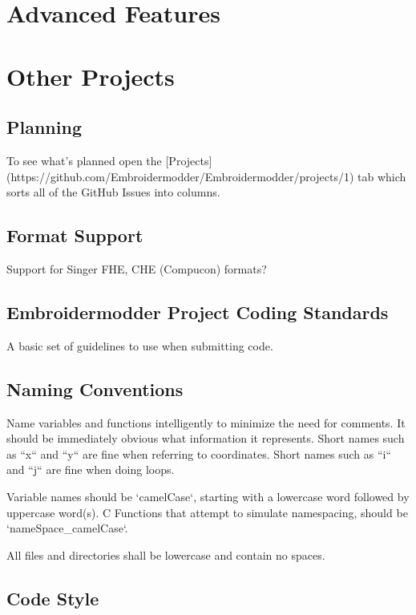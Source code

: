\documentclass[10pt]{report}
\begin{document}
\section{Advanced Features}

\section{Other Projects}

\subsection{Planning}

To see what's planned open the [Projects](https://github.com/Embroidermodder/Embroidermodder/projects/1) tab which sorts all of the GitHub Issues into columns.

\subsection{Format Support}

Support for Singer FHE, CHE (Compucon) formats?

\subsection{Embroidermodder Project Coding Standards}

A basic set of guidelines to use when submitting code.

\subsection{Naming Conventions}

Name variables and functions intelligently to minimize the need for comments.
It should be immediately obvious what information it represents.
Short names such as ``x`` and ``y`` are fine when referring to coordinates.
Short names such as ``i`` and ``j`` are fine when doing loops.

Variable names should be `camelCase`, starting with a lowercase word followed by uppercase word(s).
C Functions that attempt to simulate namespacing, should be `nameSpace\_camelCase`.

All files and directories shall be lowercase and contain no spaces.

\subsection{Code Style}
\end{document}

